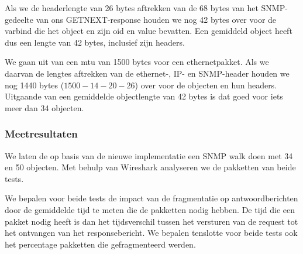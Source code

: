 Als we de headerlengte van 26 bytes aftrekken van de 68 bytes van het SNMP-gedeelte van ons GETNEXT-response houden we nog 42 bytes over voor de varbind
die het object en zijn \gls{oid} en value bevatten.
Een gemiddeld object heeft dus een lengte van 42 bytes, inclusief zijn headers.

We gaan uit van een \gls{mtu} van 1500 bytes voor een ethernetpakket.
Als we daarvan de lengtes aftrekken van de ethernet-, IP- en SNMP-header houden we nog 1440 bytes ($1500 - 14 - 20 - 26$) over voor de objecten en hun headers.
Uitgaande van een gemiddelde objectlengte van 42 bytes is dat goed voor iets meer dan 34 objecten.

\subsubsection{Meetresultaten}

We laten de \nwmretriever{} op basis van de nieuwe implementatie een SNMP walk doen met 34 en 50 objecten.
Met behulp van Wireshark analyseren we de pakketten van beide tests.

We bepalen voor beide tests de impact van de fragmentatie op antwoordberichten door de gemiddelde tijd te meten die de pakketten nodig hebben.
De tijd die een pakket nodig heeft is dan het tijdsverschil tussen het versturen van de request tot het ontvangen van het responsebericht.
We bepalen tenslotte voor beide tests ook het percentage pakketten die gefragmenteerd werden.

